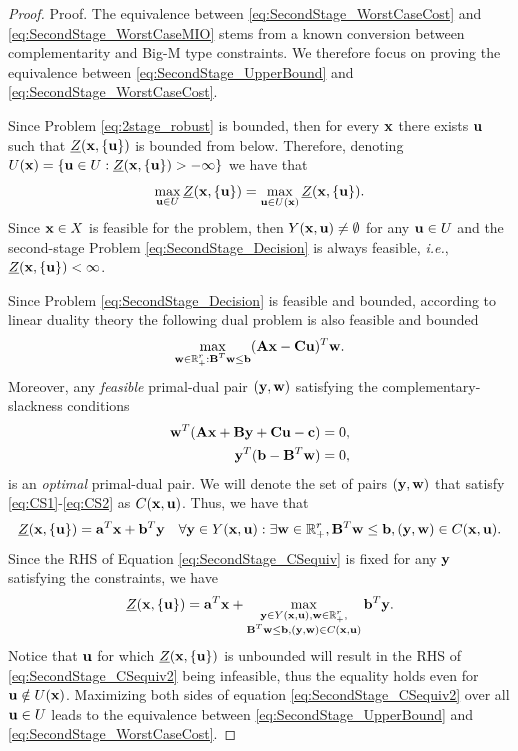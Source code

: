 \documentclass[12pt,x11names]{article}
\theoremstyle{definition}
\newcommand{\real}{\mathbb{R}} %
\newcommand{\ie}{{\em i.e.}, }
\newcommand{\ba}{{\bf a}}
\newcommand{\bb}{{\bf b}}
\newcommand{\bc}{{\bf c}}
\newcommand{\bu}{{\bf u}}
\newcommand{\bw}{{\bf w}}
\newcommand{\bx}{{\bf x}}
\newcommand{\by}{{\bf y}}
\newcommand{\bba}{{\bf A}}
\newcommand{\bbb}{{\bf B}}
\newcommand{\bbc}{{\bf C}}
\begin{document}
\begin{proof}{Proof.}
The equivalence between \eqref{eq:SecondStage_WorstCaseCost} and \eqref{eq:SecondStage_WorstCaseMIO} stems from a known conversion between complementarity and Big-M type constraints. We therefore focus on proving the equivalence between \eqref{eq:SecondStage_UpperBound} and \eqref{eq:SecondStage_WorstCaseCost}.
 
Since Problem \eqref{eq:2stage_robust} is bounded, then for every $\bx$ there exists $\bu$ such that $\underline{Z}(\bx,\{\bu\})$ is bounded from below. Therefore, denoting $U(\bx)=\{\bu\in U:\underline{Z}(\bx,\{\bu\})>-\infty\}$ we have that
$$\max_{\bu\in U}\underline{Z}(\bx,\{\bu\})=\max_{\bu\in U(\bx)}\underline{Z}(\bx,\{\bu\}).$$
Since $\bx\in X$ is feasible for the problem, then $Y(\bx,\bu)\neq \emptyset$ for any $\bu\in U$ and the second-stage Problem \eqref{eq:SecondStage_Decision} is always feasible, \ie ${\underline{Z}(\bx,\{\bu\})<\infty}$.

Since Problem \eqref{eq:SecondStage_Decision} is feasible and bounded, according to linear duality theory  the following dual problem is also feasible and bounded
\begin{equation*}
\max_{\substack{\bw\in \real_+^r:\bbb^T\bw\leq \bb}} (\bba\bx-\bbc\bu)^T\bw.
\end{equation*}
Moreover, any \emph{feasible} primal-dual pair $(\by,\bw)$ satisfying the complementary-slackness conditions 
\begin{align}
\bw^T(\bba\bx+\bbb\by+\bbc\bu-\bc)&=0,\label{eq:CS1}\\
\by^T(\bb-\bbb^T\bw)&=0\label{eq:CS2},
\end{align}
is an \emph{optimal} primal-dual pair. We will denote the set of pairs $(\by,\bw)$ that satisfy \eqref{eq:CS1}-\eqref{eq:CS2} as $C(\bx,\bu)$.
Thus, we have that
\begin{equation}\label{eq:SecondStage_CSequiv}\underline{Z}(\bx,\{\bu\})=\ba^T\bx+\bb^T\by\quad \forall \by\in Y(\bx,\bu): \exists \bw\in\real^r_+,\bbb^T\bw\leq \bb,(\by,\bw)\in C(\bx,\bu).\end{equation}
Since the RHS of Equation \eqref{eq:SecondStage_CSequiv} is fixed for any $\by$ satisfying the constraints, we have
\begin{equation}\label{eq:SecondStage_CSequiv2}\underline{Z}(\bx,\{\bu\})=\ba^T\bx+\max_{\substack{\by\in Y(\bx,\bu),\bw\in\real^r_+,\\
\bbb^T\bw\leq \bb,(\by,\bw)\in C(\bx,\bu)}}\bb^T\by.\end{equation}
Notice that $\bu$ for which $\underline{Z}(\bx,\{\bu\})$ is unbounded will result in the RHS of \eqref{eq:SecondStage_CSequiv2} being infeasible, thus the equality holds even for $\bu\notin U(\bx)$. 
Maximizing both sides of equation \eqref{eq:SecondStage_CSequiv2} over all $\bu\in U$ leads to the equivalence between \eqref{eq:SecondStage_UpperBound} and \eqref{eq:SecondStage_WorstCaseCost}. %
\end{proof}
\end{document}
